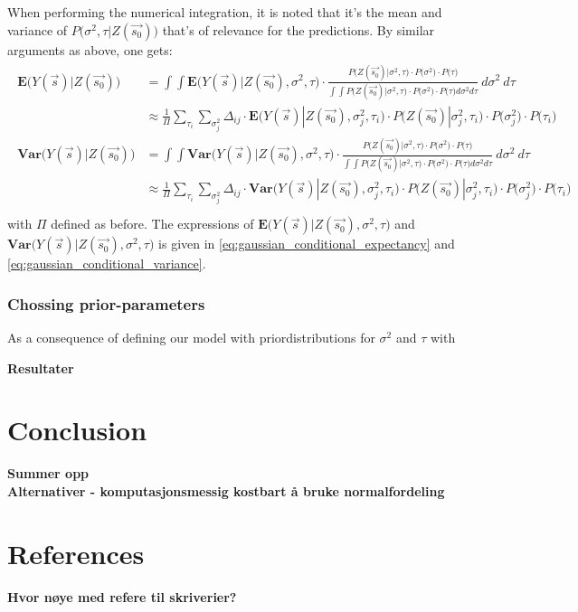 \documentclass{report}
\begin{document}
When performing the numerical integration, it is noted that it's the mean and variance of $P\big( \sigma^2, \tau | Z(\vec{s_0}) \big)$ that's of relevance for the predictions. By similar arguments as above, one gets:
\begin{align}
\begin{split}
\mathbf{E} \big( Y(\vec{s}) | Z(\vec{s_0}) \big) &= \int \int \mathbf{E} \big( Y(\vec{s}) | Z(\vec{s_0}), \sigma^2, \tau \big) \cdot \frac{P\big( Z(\vec{s_0}) | \sigma^2, \tau \big) \cdot P\big( \sigma^2 \big) \cdot P\big( \tau \big)}{\int \int P\big( Z(\vec{s_0}) | \sigma^2, \tau \big) \cdot P\big( \sigma^2 \big) \cdot P\big( \tau \big) d\sigma^2 d\tau} \ d\sigma^2 \ d\tau \\
&\approx \frac{1}{\Pi}\sum_{\tau_i} \sum_{\sigma^2_j} \Delta_{ij} \cdot \mathbf{E} \big( Y(\vec{s}) | Z(\vec{s_0}), \sigma^2_j, \tau_i \big) \cdot P\big( Z(\vec{s_0}) | \sigma^2_j, \tau_i \big) \cdot P\big( \sigma^2_j \big) \cdot P\big( \tau_i \big) \\
\mathbf{Var} \big( Y(\vec{s}) | Z(\vec{s_0}) \big) &= \int \int \mathbf{Var} \big( Y(\vec{s}) | Z(\vec{s_0}), \sigma^2, \tau \big) \cdot \frac{P\big( Z(\vec{s_0}) | \sigma^2, \tau \big) \cdot P\big( \sigma^2 \big) \cdot P\big( \tau \big)}{\int \int P\big( Z(\vec{s_0}) | \sigma^2, \tau \big) \cdot P\big( \sigma^2 \big) \cdot P\big( \tau \big) d\sigma^2 d\tau} \ d\sigma^2 \ d\tau \\
&\approx \frac{1}{\Pi}\sum_{\tau_i} \sum_{\sigma^2_j} \Delta_{ij} \cdot \mathbf{Var} \big( Y(\vec{s}) | Z(\vec{s_0}), \sigma^2_j, \tau_i \big) \cdot P\big( Z(\vec{s_0}) | \sigma^2_j, \tau_i \big) \cdot P\big( \sigma^2_j \big) \cdot P\big( \tau_i \big) \\\end{split}
\end{align}
with $\Pi$ defined as before. The expressions of $\mathbf{E} \big( Y(\vec{s}) | Z(\vec{s_0}), \sigma^2, \tau \big)$ and $\mathbf{Var} \big( Y(\vec{s}) | Z(\vec{s_0}), \sigma^2, \tau \big)$ is given in \ref{eq:gaussian_conditional_expectancy} and \ref{eq:gaussian_conditional_variance}.

\subsection{Chossing prior-parameters}
As a consequence of defining our model with priordistributions for $\sigma^2$ and $\tau$ with


\textbf{Resultater} \\
\chapter{Conclusion}
\textbf{Summer opp} \\
\textbf{Alternativer - komputasjonsmessig kostbart å bruke normalfordeling} \\
\chapter{References}
\textbf{Hvor nøye med refere til skriverier?}
\end{document}
